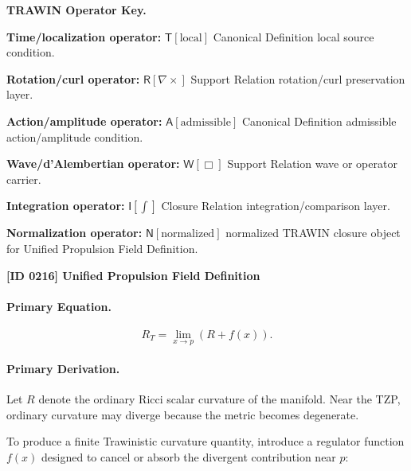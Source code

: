 \par\vspace{0.45\baselineskip}
\noindent\begin{minipage}[t]{\linewidth}
\begingroup
\small
\raggedright
\textbf{TRAWIN Operator Key.}\par
\noindent\textbf{Time/localization operator:} $\mathsf{T}\!\left[\mathrm{local}\right]$ Canonical Definition local source condition.\par
\noindent\textbf{Rotation/curl operator:} $\mathsf{R}\!\left[\nabla\times\right]$ Support Relation rotation/curl preservation layer.\par
\noindent\textbf{Action/amplitude operator:} $\mathsf{A}\!\left[\mathrm{admissible}\right]$ Canonical Definition admissible action/amplitude condition.\par
\noindent\textbf{Wave/d'Alembertian operator:} $\mathsf{W}\!\left[\Box\right]$ Support Relation wave or operator carrier.\par
\noindent\textbf{Integration operator:} $\mathsf{I}\!\left[\int\right]$ Closure Relation integration/comparison layer.\par
\noindent\textbf{Normalization operator:} $\mathsf{N}\!\left[\mathrm{normalized}\right]$ normalized TRAWIN closure object for Unified Propulsion Field Definition.\par
\endgroup
\end{minipage}

\clearpage
\noindent\textbf{[ID 0216] Unified Propulsion Field Definition}\par
\vspace{0.35em}
\paragraph{Primary Equation.}
\begin{equation}
R_T
=
\lim_{x\to p}
\left(
R+f(x)
\right).
\end{equation}

\paragraph{Primary Derivation.}
Let $R$ denote the ordinary Ricci scalar curvature of the manifold.  
Near the TZP, ordinary curvature may diverge because the metric becomes degenerate.

To produce a finite Trawinistic curvature quantity, introduce a regulator function $f(x)$ designed to cancel or absorb the divergent contribution near $p$:

